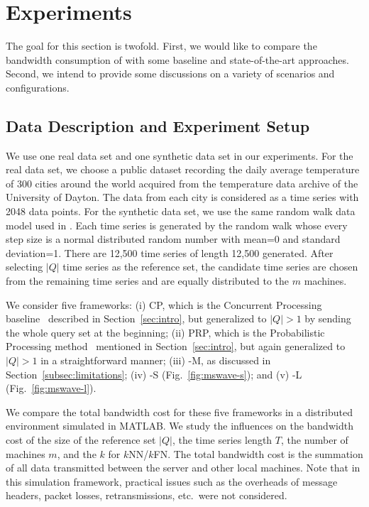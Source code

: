 \section{Experiments}\label{sec:exp}

The goal for this section is twofold. First, we would like to compare
the bandwidth consumption of \MSWave{} with some baseline and
state-of-the-art approaches. Second, we intend to provide some discussions
on a variety of scenarios and configurations.

\subsection{Data Description and Experiment Setup}\label{subsec:setup}

We use one real data set and one synthetic data set in our experiments. For the real data set,
we choose a public dataset recording the daily average temperature of
300 cities around the world acquired from the temperature data archive
of the University of Dayton. The data from each city is considered as a
time series with 2048 data points. 
For the synthetic data set, we use the same random walk data model used in \cite{Rakthanmanon:2012:SMT}. Each time series is generated by the random walk whose every step size is a normal distributed random number with mean=0 and standard deviation=1. There are 12,500 time series of length 12,500 generated.
After selecting $|Q|$ time series as
the reference set, the candidate time series are chosen from the remaining
time series and are equally distributed to the $m$ machines.

We consider five frameworks: (i) CP, which is the Concurrent
Processing baseline~\cite{PAP01DPS} described in
Section~\ref{sec:intro}, but generalized to $|Q| > 1$ by sending the
whole query set at the beginning; (ii) PRP, which is the Probabilistic
Processing method~\cite{PAP01DPS} mentioned in Section~\ref{sec:intro}, 
but again generalized to $|Q| > 1$ in a straightforward manner;
(iii) \LeeWave-M{}, as discussed in Section~\ref{subsec:limitations};
(iv) \MSWave-S{} (Fig.~\ref{fig:mswave-s}); and 
(v) \MSWave-L{} (Fig.~\ref{fig:mswave-l}).

We compare the total bandwidth cost for these five frameworks in a
distributed environment simulated in MATLAB. We study the influences 
on the bandwidth cost of the size of the reference set $|Q|$, the time series 
length $T$, the number of machines $m$, and the $k$ for $k$NN/$k$FN.
The total bandwidth
cost is the summation of all data transmitted between the server and
other local machines. Note that in this simulation framework,
practical issues such as the overheads of message headers, packet losses,
retransmissions, etc.~were not considered.

